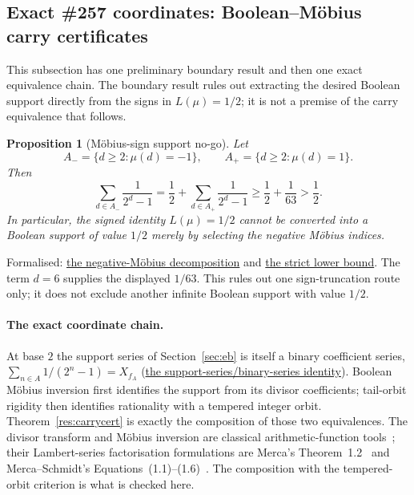 \documentclass[11pt]{article}
\newcommand{\commit}{99f4bf47422abbd8757cbb22b50ba079d764d3a7}
\newcommand{\repobase}{https://github.com/wcook04/plectis-erdos/blob/\commit}
\newcommand{\PK}{Erdos249257}
\newcommand{\lword}[4]{\href{\repobase/\PK/#1\#L#2}{#4}}
\newtheorem{proposition}[theorem]{Proposition}
\theoremstyle{definition}
\theoremstyle{remark}
\begin{document}
\subsection{Exact \#257 coordinates: Boolean--M\"obius carry certificates}
\label{app:carry-boolean}

This subsection has one preliminary boundary result and then one exact
equivalence chain.  The boundary result rules out extracting the desired
Boolean support directly from the signs in \(L(\mu)=1/2\); it is not a premise
of the carry equivalence that follows.

\begin{proposition}[M\"obius-sign support no-go]\label{res:mobiussignnogo}
Let
\[
 A_-=\{d\ge2:\mu(d)=-1\},
 \qquad A_+=\{d\ge2:\mu(d)=1\}.
\]
Then
\[
 \sum_{d\in A_-}\frac1{2^d-1}
 =\frac12+\sum_{d\in A_+}\frac1{2^d-1}
 \ge\frac12+\frac1{63}>\frac12.
\]
In particular, the signed identity \(L(\mu)=1/2\) cannot be converted into a
Boolean support of value \(1/2\) merely by selecting the negative M\"obius
indices.
\end{proposition}
\noindent Formalised:
\lword{MobiusSignSupportNoGo.lean}{111}{tsum_negativeMobius_eq_half_add_positiveMobiusTail}{the negative-M\"obius decomposition}
and
\lword{MobiusSignSupportNoGo.lean}{150}{half_add_one_div_sixty_three_le_tsum_negativeMobius}{the strict lower bound}.
The term \(d=6\) supplies the displayed \(1/63\).  This rules out one
sign-truncation route only; it does not exclude another infinite Boolean
support with value \(1/2\).

\paragraph{The exact coordinate chain.}
At base $2$ the support series of Section~\ref{sec:eb} is itself a binary
coefficient series, $\sum_{n\in A}1/(2^n-1)=X_{f_A}$
(\lword{BooleanMobiusCarry.lean}{377}{erdosSupportSeries_two_eq_binaryCoeffSeries}{the support-series/binary-series identity}).
Boolean M\"obius inversion first identifies the support from its divisor
coefficients; tail-orbit rigidity then identifies rationality with a tempered
integer orbit.  Theorem~\ref{res:carrycert} is exactly the composition of
those two equivalences.  The divisor transform and M\"obius inversion are
classical arithmetic-function tools~\cite[Thm.~2.9, p.~32]{apostol}; their
Lambert-series factorisation formulations are Merca's
Theorem~1.2~\cite[pp.~420--421]{merca2017} and Merca--Schmidt's
Equations~(1.1)--(1.6)~\cite[pp.~31--34]{mercaschmidt}.  The composition with the
tempered-orbit criterion is what is checked here.
\end{document}
